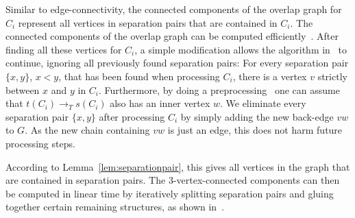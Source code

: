\documentclass[paper=a4]{scrartcl}
\begin{document}
Similar to edge-connectivity, the connected components of the overlap graph for $C_i$ represent all vertices in separation pairs that are contained in $C_i$. The connected components of the overlap graph can be computed efficiently~\cite[Lemma~51]{Schmidt2013}. After finding all these vertices for $C_i$, a simple modification allows the algorithm in~\cite[p.\ 508]{Schmidt2013} to continue, ignoring all previously found separation pairs: For every separation pair $\{x,y\}$, $x < y$, that has been found when processing $C_i$, there is a vertex $v$ strictly between $x$ and $y$ in $C_i$. Furthermore, by doing a preprocessing~\cite[Property~B, p.\ 508]{Schmidt2013} one can assume that $t(C_i) \rightarrow_T s(C_i)$ also has an inner vertex $w$. We eliminate every separation pair $\{x,y\}$ after processing $C_i$ by simply adding the new back-edge $vw$ to $G$. As the new chain containing $vw$ is just an edge, this does not harm future processing steps.

According to Lemma~\ref{lem:separationpair}, this gives all vertices in the graph that are contained in separation pairs. The $3$-vertex-connected components can then be computed in linear time by iteratively splitting separation pairs and gluing together certain remaining structures, as shown in~\cite{Hopcroft1973,Gutwenger2001}.
\end{document}
